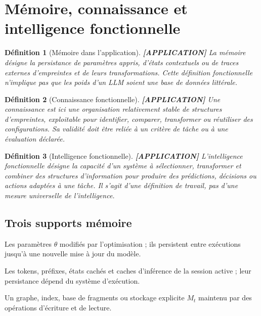 \documentclass[11pt,a4paper]{article}
\newtheorem{definition}{Définition}[section]
\theoremstyle{remark}
\begin{document}
\section{Mémoire, connaissance et intelligence fonctionnelle}

\begin{definition}[Mémoire dans l'application] \textbf{[APPLICATION]}
La mémoire désigne la persistance de paramètres appris, d'états contextuels ou de traces externes d'empreintes et de leurs transformations. Cette définition fonctionnelle n'implique pas que les poids d'un LLM soient une base de données littérale.
\end{definition}

\begin{definition}[Connaissance fonctionnelle] \textbf{[APPLICATION]}
Une connaissance est ici une organisation relativement stable de structures d'empreintes, exploitable pour identifier, comparer, transformer ou réutiliser des configurations. Sa validité doit être reliée à un critère de tâche ou à une évaluation déclarée.
\end{definition}

\begin{definition}[Intelligence fonctionnelle] \textbf{[APPLICATION]}
L'intelligence fonctionnelle désigne la capacité d'un système à sélectionner, transformer et combiner des structures d'information pour produire des prédictions, décisions ou actions adaptées à une tâche. Il s'agit d'une définition de travail, pas d'une mesure universelle de l'intelligence.
\end{definition}

\subsection{Trois supports mémoire}
\begin{description}[style=nextline,leftmargin=3.1cm]
  \item[Paramétrique] Les paramètres $\theta$ modifiés par l'optimisation ; ils persistent entre exécutions jusqu'à une nouvelle mise à jour du modèle.
  \item[Contextuel] Les tokens, préfixes, états cachés et caches d'inférence de la session active ; leur persistance dépend du système d'exécution.
  \item[Externe persistante] Un graphe, index, base de fragments ou stockage explicite $M_t$ maintenu par des opérations d'écriture et de lecture.
\end{description}
\end{document}
